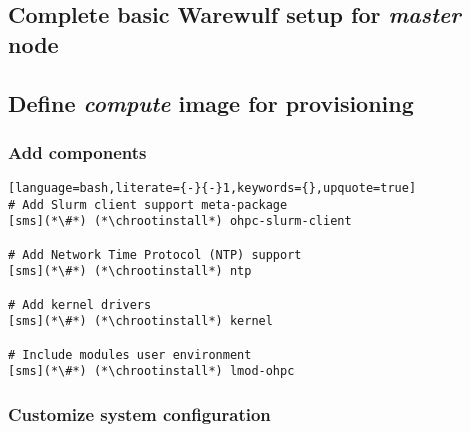 \documentclass[letterpaper]{article}
\newcommand{\chrootinstall}{yum -y --installroot=\$CHROOT install}
\begin{document}
\vspace*{-0.15cm}
\subsection{Complete basic Warewulf setup for {\em master} node} \label{sec:setup_ww}




\subsection{Define {\em compute} image for provisioning}


\subsubsection{Add \OHPC{} components} \label{sec:add_components}


\begin{lstlisting}[language=bash,literate={-}{-}1,keywords={},upquote=true]
# Add Slurm client support meta-package
[sms](*\#*) (*\chrootinstall*) ohpc-slurm-client

# Add Network Time Protocol (NTP) support
[sms](*\#*) (*\chrootinstall*) ntp

# Add kernel drivers
[sms](*\#*) (*\chrootinstall*) kernel

# Include modules user environment
[sms](*\#*) (*\chrootinstall*) lmod-ohpc
\end{lstlisting}

\subsubsection{Customize system configuration} \label{sec:master_customization}



\end{document}
